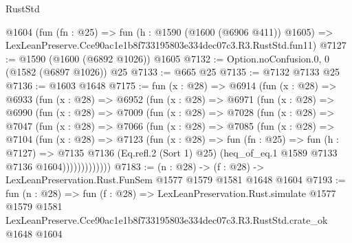 \begin{lexlean}{RustStd}
\begin{coremodule}
    @1604
    (fun (fn : @25) =>
    fun (h : @1590 (@1600 (@6906 @411)) @1605) =>
    LexLeanPreserve.Cce90ac1e1b8f733195803e334dec07c3.R3.RustStd.fun11)
@7127 := @1590 (@1600 (@6892 @1026)) @1605
@7132 := Option.noConfusion.{0, 0} (@1582 (@6897 @1026)) @25
@7133 := @665 @25
@7135 := @7132 @7133 @25
@7136 := @1603 @1648
@7175 := fun (x : @28) =>
  @6914
    (fun (x : @28) =>
    @6933
      (fun (x : @28) =>
      @6952
        (fun (x : @28) =>
        @6971
          (fun (x : @28) =>
          @6990
            (fun (x : @28) =>
            @7009
              (fun (x : @28) =>
              @7028
                (fun (x : @28) =>
                @7047
                  (fun (x : @28) =>
                  @7066
                    (fun (x : @28) =>
                    @7085
                      (fun (x : @28) =>
                      @7104
                        (fun (x : @28) =>
                        @7123
                          (fun (x : @28) =>
                          fun (fn : @25) =>
                          fun (h : @7127) =>
                          @7135
                            @7136
                            (Eq.refl.{2} (Sort 1) @25)
                            (heq_of_eq.{1} @1589 @7133 @7136 @1604)))))))))))))
@7183 := (n : @28) -> (f : @28) -> LexLeanPreservation.Rust.FunSem @1577 @1579 @1581 @1648 @1604
@7193 := fun (n : @28) =>
  fun (f : @28) =>
  LexLeanPreservation.Rust.simulate
    @1577
    @1579
    @1581
    LexLeanPreserve.Cce90ac1e1b8f733195803e334dec07c3.R3.RustStd.crate_ok
    @1648
    @1604
\end{coremodule}
\end{lexlean}
